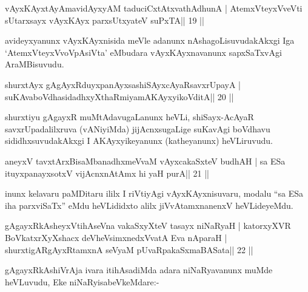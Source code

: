 \begin{shl}
vAyxKAyxtAyAmavidAyxyAM taduciCxtAtxvathAdhunA |
AtemxVteyxVveVti sUtarxsayx vAyxKAyx parxsUtxyateV suPxTA\hfill || 19 ||
\end{shl}

\begin{artha}
avideyxyanunx vAyxKAyxnisida meVle adanunx nAshagoLisuvudakAkxgi Iga `AtemxVteyxVvoVpAsiVta' eMbudara vAyxKAyxnavanunx sapxSaTxvAgi AraMBisuvudu.
\end{artha}


\begin{shl}
shurxtAyx gAgAyxRduyxpanAyxsashiSAyxcAyaRsavxrUpayA |
suKAvaboVdhasidadhxyXthaRmiyamAKAyxyikoVditA\hfill || 20 ||
\end{shl}

\begin{artha}
shurxtiyu gAgayxR muMtAdavugaLanunx heVLi, shiSayx-AcAyaR savxrUpadalilxruva (vANiyiMda) jijAcnxsugaLige suKavAgi boVdhavu sididhxsuvudakAkxgi I AKAyxyikeyanunx (katheyanunx) heVLiruvudu.
\end{artha}


\begin{shl}
aneyxV tavxtArxBisaMbanadhxmeVvaM vAyxcakaSxteV budhAH |
sa ESa ituyxpanayxsotxV vijAcnxnAtAmx hi yaH purA\hfill || 21 ||
\end{shl}

\begin{artha}
inunx kelavaru paMDitaru ililx I riVtiyAgi vAyxKAyxnisuvaru, modalu ``sa ESa iha parxviSaTx'' eMdu heVLididxto alilx jiVvAtamxnanenxV heVLideyeMdu.
\end{artha}


\begin{shl}
gAgayxRkAsheyxVtihAseVna vakaSxyXteV tasayx niNaRyaH |
katorxyXVR BoVkatxrXyXshacx deVheV\s simxnedxVvatA Eva nAparaH |
shurxtigARgAyxRtamxnA seVyaM pUvaRpakaSxmaBASata\hfill || 22 ||
\end{shl}

\begin{artha}
gAgayxRkAshiVrAja ivara itihAsadiMda adara niNaRyavanunx muMde heVLuvudu, Eke niNaRyisabeVkeMdare:-
\end{artha} 

